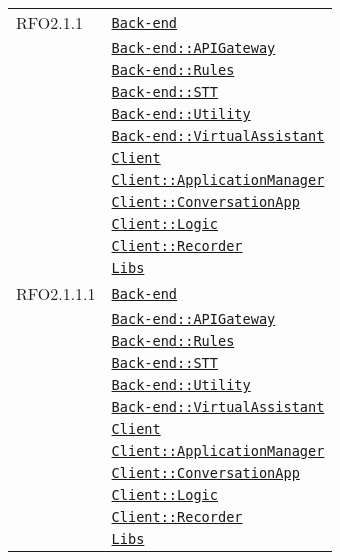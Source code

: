 \begin{longtable}{|>{\centering}m{3cm}|m{10cm}<{\centering}|}
RFO2.1.1 & \hyperref[Back-end]{\texttt{Back-end}}\\
& \hyperref[Back-end::APIGateway]{\texttt{Back-end::APIGateway}}\\
& \hyperref[Back-end::Rules]{\texttt{Back-end::Rules}}\\
& \hyperref[Back-end::STT]{\texttt{Back-end::STT}}\\
& \hyperref[Back-end::Utility]{\texttt{Back-end::Utility}}\\
& \hyperref[Back-end::VirtualAssistant]{\texttt{Back-end::VirtualAssistant}}\\
& \hyperref[Client]{\texttt{Client}}\\
& \hyperref[Client::ApplicationManager]{\texttt{Client::ApplicationManager}}\\
& \hyperref[Client::ConversationApp]{\texttt{Client::ConversationApp}}\\
& \hyperref[Client::Logic]{\texttt{Client::Logic}}\\
& \hyperref[Client::Recorder]{\texttt{Client::Recorder}}\\
& \hyperref[Libs]{\texttt{Libs}}\\ \hline

RFO2.1.1.1 & \hyperref[Back-end]{\texttt{Back-end}}\\
& \hyperref[Back-end::APIGateway]{\texttt{Back-end::APIGateway}}\\
& \hyperref[Back-end::Rules]{\texttt{Back-end::Rules}}\\
& \hyperref[Back-end::STT]{\texttt{Back-end::STT}}\\
& \hyperref[Back-end::Utility]{\texttt{Back-end::Utility}}\\
& \hyperref[Back-end::VirtualAssistant]{\texttt{Back-end::VirtualAssistant}}\\
& \hyperref[Client]{\texttt{Client}}\\
& \hyperref[Client::ApplicationManager]{\texttt{Client::ApplicationManager}}\\
& \hyperref[Client::ConversationApp]{\texttt{Client::ConversationApp}}\\
& \hyperref[Client::Logic]{\texttt{Client::Logic}}\\
& \hyperref[Client::Recorder]{\texttt{Client::Recorder}}\\
& \hyperref[Libs]{\texttt{Libs}}\\ \hline


\end{longtable}

